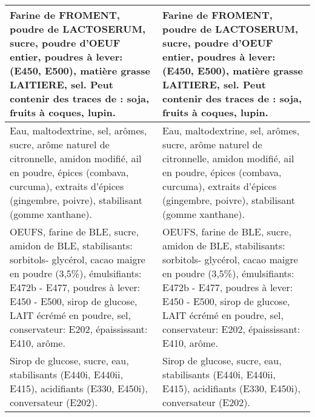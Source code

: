 \begin{tabular}{p{7cm}p{7cm}}
                                                                                                                                                             Farine de FROMENT, poudre de LACTOSERUM, sucre, poudre d'OEUF entier, poudres à lever: (E450, E500), matière grasse LAITIERE, sel. \newline Peut contenir des traces de : soja, fruits à coques, lupin. &                                                                                                                                                                  Farine de FROMENT, poudre de LACTOSERUM, sucre, poudre d'OEUF entier, poudres à lever: (E450,  \newline E500), matière grasse LAITIERE, sel. \newline Peut contenir des traces de : soja, fruits à coques, lupin. \\ \hline
                                                                                                                                                        Eau, maltodextrine, sel, arômes, sucre, arôme naturel de citronnelle, amidon modifié, ail en poudre, épices (combava, curcuma), extraits d'épices (gingembre, poivre), stabilisant (gomme xanthane). &                                                                                                                                                          Eau, maltodextrine, sel, arômes, sucre, arôme naturel de citronnelle, amidon modifié, ail en poudre, épices (combava, curcuma), extraits  \newline d'épices (gingembre, poivre), stabilisant (gomme xanthane).    \\ \hline
                                                                                        OEUFS, farine de BLE, sucre, amidon de BLE, stabilisants: sorbitols- glycérol, cacao maigre en poudre (3,5\%), émulsifiants: E472b - E477, poudres à lever: E450 - E500, sirop de glucose, LAIT écrémé en poudre, sel, conservateur: E202, épaississant: E410, arôme. &                                                                                             OEUFS, farine de BLE, sucre, amidon de BLE, stabilisants: sorbitols- glycérol, cacao maigre en poudre (3,5\%), émulsifiants: E472b - E477, poudres à lever: E450 - E500, sirop de glucose, LAIT  \newline écrémé en poudre, sel, conservateur: E202, épaississant: E410, arôme. \\ \hline
                                                                                                                                                                                                                                           Sirop de glucose, sucre, eau, stabilisants (E440i, E440ii, E415), acidifiants (E330, E450i), conversateur (E202). &                                                                                                                                                                                                                                                  Sirop de glucose, sucre, eau, stabilisants (E440i, E440ii, E415), acidifiants (E330, E450i), conversateur (E202). \\ \hline

\end{tabular}
